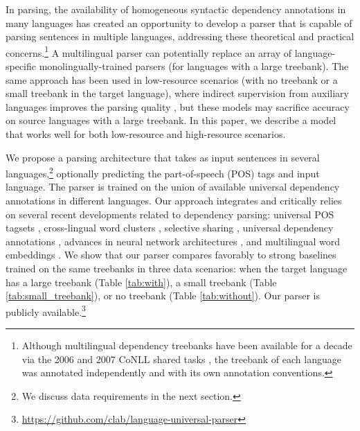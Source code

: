 \documentclass[11pt]{article}
\begin{document}
In parsing, the availability of homogeneous syntactic dependency annotations in many languages \cite{mcdonald:13,universal:v1_0,universal:v1_1,universal:v1_2} has created an opportunity to develop a parser that is capable of parsing sentences in multiple languages, addressing these theoretical and practical concerns.\footnote{Although multilingual dependency treebanks have been available for a decade via the 2006 and 2007 CoNLL shared tasks \cite{buchholz:06,nivre:07}, the treebank of each language was annotated independently and with its own annotation conventions.}
A multilingual parser can potentially replace an array of language-specific monolingually-trained parsers (for languages with a large treebank).
The same approach has been used in low-resource scenarios (with no treebank or a small treebank in the target language), where indirect supervision from auxiliary languages improves the parsing quality \cite{cohen:11,mcdonald:11,zhang:15,duong:15b,duong:15,guo:16}, but these models may sacrifice accuracy on source languages with a large treebank.
In this paper, we describe a model that works well for both low-resource and high-resource scenarios.

We propose a parsing architecture that takes as input sentences in several languages,\footnote{We discuss data requirements in the next section.} optionally predicting the part-of-speech (POS) tags and input language.
The parser is trained on the union of available universal dependency annotations in different languages.
Our approach integrates and critically relies on several recent developments related to dependency parsing: universal POS tagsets \cite{petrov:12}, cross-lingual word clusters \cite{tackstrom:12}, selective sharing \cite{naseem:12}, universal dependency annotations \cite{mcdonald:13,universal:v1_0,universal:v1_1,universal:v1_2}, advances in neural network architectures \cite{chen:14,dyer:15}, and multilingual word embeddings \cite{gardner:15,guo:16,ammar:16}.
We show that our parser compares favorably to strong baselines trained on the same treebanks in three data scenarios: when the target language has a large treebank (Table \ref{tab:with}), a small treebank (Table \ref{tab:small_treebank}), or no treebank (Table \ref{tab:without}).
Our parser is publicly available.\footnote{\url{https://github.com/clab/language-universal-parser}}
\end{document}
